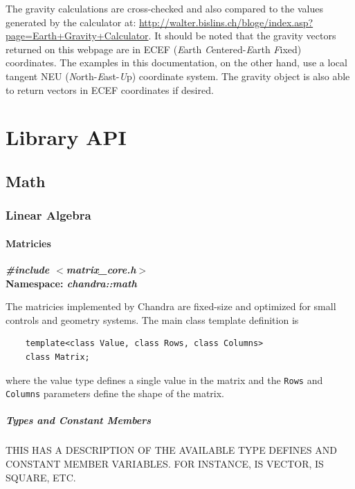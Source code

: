 \documentclass[10pt,letterpaper]{memoir} %
\newcommand{\apiheader}[2]{\noindent{}\textbf{\emph{\#include $<$#1$>$}}\\\noindent{}\textbf{Namespace: \emph{#2}}}
\begin{document}
The gravity calculations are cross-checked and also compared to the values generated by the calculator at: \url{http://walter.bislins.ch/bloge/index.asp?page=Earth+Gravity+Calculator}.  It should be noted that the gravity vectors returned on this webpage are in ECEF (\emph{E}arth \emph{C}entered-\emph{E}arth \emph{F}ixed) coordinates.  The examples in this documentation, on the other hand, use a local tangent NEU (\emph{N}orth-\emph{E}ast-\emph{U}p) coordinate system.  The gravity object is also able to return vectors in ECEF coordinates if desired.

\part{Library API}
\chapter{Math}

\section{Linear Algebra}
\subsection{Matricies}
\label{sec:math:matricies}
\apiheader{matrix\_core.h}{chandra::math}

The matricies implemented by Chandra are fixed-size and optimized for small controls and geometry systems.  The main class template definition is
\begin{verbatim}
	template<class Value, class Rows, class Columns>
	class Matrix;	
\end{verbatim}
where the value type defines a single value in the matrix and the \texttt{Rows} and \texttt{Columns} parameters define the shape of the matrix.

\subsubsection{Types and Constant Members}
THIS HAS A DESCRIPTION OF THE AVAILABLE TYPE DEFINES AND CONSTANT MEMBER VARIABLES. FOR INSTANCE, IS VECTOR, IS SQUARE, ETC.
 
\end{document}
